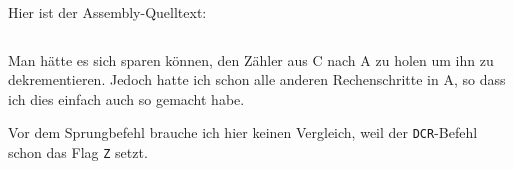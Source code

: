 Hier ist der Assembly-Quelltext:

\inputminted[fontsize=\small, linenos]{python}{../Assembly/g.s}

Man hätte es sich sparen können, den Zähler aus C nach A zu holen um ihn zu
dekrementieren. Jedoch hatte ich schon alle anderen Rechenschritte in A, so
dass ich dies einfach auch so gemacht habe.

Vor dem Sprungbefehl brauche ich hier keinen Vergleich, weil der
\texttt{DCR}-Befehl schon das Flag \texttt Z setzt.


\FloatBarrier
\IfFileExists{\bibliographyfile}{
	
}{}



